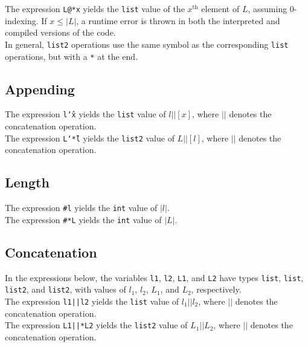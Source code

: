 \documentclass[11pt]{article}
\begin{document}
The expression \texttt{L@*x} yields the \texttt{list} value of the $x^{\textrm{th}}$ element of $L$, assuming 0-indexing. If $x\le |L|$, a runtime error is thrown in both the interpreted and compiled versions of the code. \\

In general, \texttt{list2} operations use the same symbol as the corresponding \texttt{list} operations, but with a \texttt{*} at the end.

\subsection{Appending}

The expression \texttt{l\char`\^x} yields the \texttt{list} value of $l||[x]$, where $||$ denotes the concatenation operation. \\

The expression \texttt{L\char`\^*l} yields the \texttt{list2} value of $L||[l]$, where $||$ denotes the concatenation operation.

\subsection{Length} 

The expression \texttt{\#l} yields the \texttt{int} value of $|l|$. \\

The expression \texttt{\#*L} yields the \texttt{int} value of $|L|$. 

\subsection{Concatenation}

In the expressions below, the variables \texttt{l1}, \texttt{l2}, \texttt{L1}, and \texttt{L2} have types \texttt{list}, \texttt{list}, \texttt{list2}, and \texttt{list2}, with values of $l_1$, $l_2$, $L_1$, and $L_2$, respectively. \\

The expression \texttt{l1||l2} yields the \texttt{list} value of $l_1||l_2$, where $||$ denotes the concatenation operation. \\

The expression \texttt{L1||*L2} yields the \texttt{list2} value of $L_1||L_2$, where $||$ denotes the concatenation operation.
\end{document}
